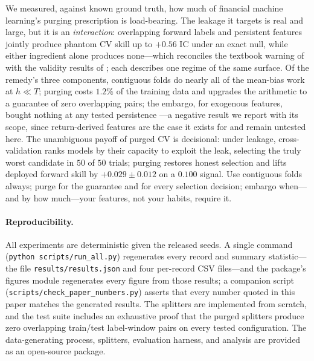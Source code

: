 \documentclass[11pt]{article}
\begin{document}
We measured, against known ground truth, how much of financial machine
learning's purging prescription is load-bearing. The leakage it targets is
real and large, but it is an \emph{interaction}: overlapping forward labels
and persistent features jointly produce phantom CV skill up to
$+0.56$ IC under an exact null, while either ingredient alone produces
none---which reconciles the textbook warning of
\citet{lopezdeprado2018advances} with the validity results of
\citet{bergmeir2018note}; each describes one regime of the same surface.
Of the remedy's three components, contiguous folds do nearly all of the
mean-bias work at $h \ll T$; purging costs $1.2\%$ of the training data and
upgrades the arithmetic to a guarantee of zero overlapping pairs; the
embargo, for exogenous features, bought nothing at any tested persistence
---a negative result we report with its scope, since return-derived features
are the case it exists for and remain untested here. The unambiguous payoff
of purged CV is decisional: under leakage, cross-validation ranks models by
their capacity to exploit the leak, selecting the truly worst candidate in
$50$ of $50$ trials; purging restores honest selection and lifts deployed
forward skill by $+0.029 \pm 0.012$ on a $0.100$ signal. Use contiguous
folds always; purge for the guarantee and for every selection decision;
embargo when---and by how much---your features, not your habits, require it.

\paragraph{Reproducibility.} All experiments are deterministic given the
released seeds. A single command (\texttt{python scripts/run\_all.py})
regenerates every record and summary statistic---the file
\texttt{results/results.json} and four per-record CSV files---and the
package's figures module regenerates every figure from those results; a
companion script (\texttt{scripts/check\_paper\_numbers.py}) asserts that
every number quoted in this paper matches the generated results. The
splitters are implemented
from scratch, and the test suite includes an exhaustive proof that the
purged splitters produce zero overlapping train/test label-window pairs on
every tested configuration. The data-generating process, splitters,
evaluation harness, and analysis are provided as an open-source package.

\small


\end{document}
